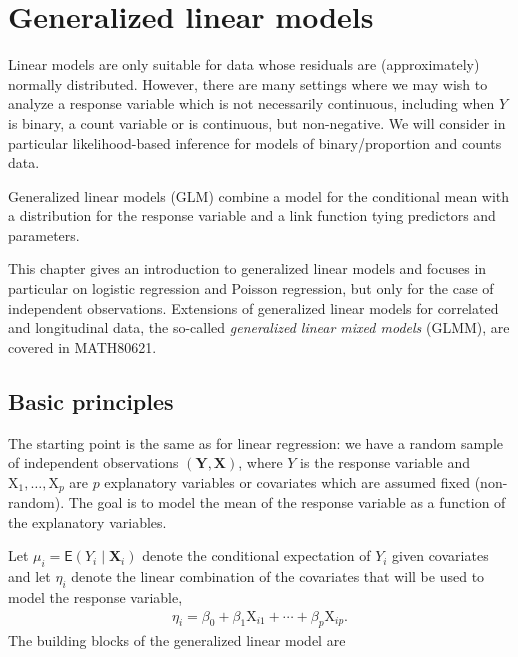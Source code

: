 \documentclass[
  11pt,
  letterpaper,
]{book}
\theoremstyle{definition}
\theoremstyle{definition}
\theoremstyle{definition}
\theoremstyle{definition}
\theoremstyle{remark}
\begin{document}
\hypertarget{generalized-linear-models}{%
\chapter{Generalized linear models}\label{generalized-linear-models}}

Linear models are only suitable for data whose residuals are (approximately)
normally distributed. However, there are many settings where we may wish
to analyze a response variable which is not necessarily continuous,
including when \(Y\) is binary, a count variable or is continuous, but
non-negative. We will consider in particular likelihood-based inference
for models of binary/proportion and counts data.

Generalized linear models (GLM) combine a model for the conditional mean
with a distribution for the response variable and a link function tying
predictors and parameters.

This chapter gives an introduction to generalized linear models and
focuses in particular on logistic regression and Poisson regression, but
only for the case of independent observations. Extensions of generalized
linear models for correlated and longitudinal data, the so-called
\emph{generalized linear mixed models} (GLMM), are covered in MATH80621.

\hypertarget{basic-principles}{%
\section{Basic principles}\label{basic-principles}}

The starting point is the same as for linear regression: we have a
random sample of independent observations
\((\boldsymbol{Y}, \mathbf{X})\), where \(Y\) is the response variable and
\(\mathrm{X}_1, \ldots, \mathrm{X}_p\) are \(p\) explanatory variables or
covariates which are assumed fixed (non-random). The goal is to model
the mean of the response variable as a function of the explanatory
variables.

Let \(\mu_i=\mathsf{E}(Y_i \mid \mathbf{X}_i)\) denote the conditional
expectation of \(Y_i\) given covariates and let \(\eta_i\) denote the linear
combination of the covariates that will be used to model the response
variable,
\begin{align*}
\eta_i=\beta_0 + \beta_1 \mathrm{X}_{i1} + \cdots + \beta_p \mathrm{X}_{ip}.
\end{align*}
The building blocks of the generalized linear model are
\end{document}
